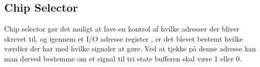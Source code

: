 
\subsection{Chip Selector}
Chip selector gør det muligt at lave en kontrol af hvilke adresser der bliver skrevet til, og igennem et I/O adresse register%
, er det blevet bestemt hvilke værdier der har med hvilke signaler at gøre. Ved at tjekke på denne adresse kan man derved bestemme om et signal til tri state bufferen skal være 1 eller 0.
